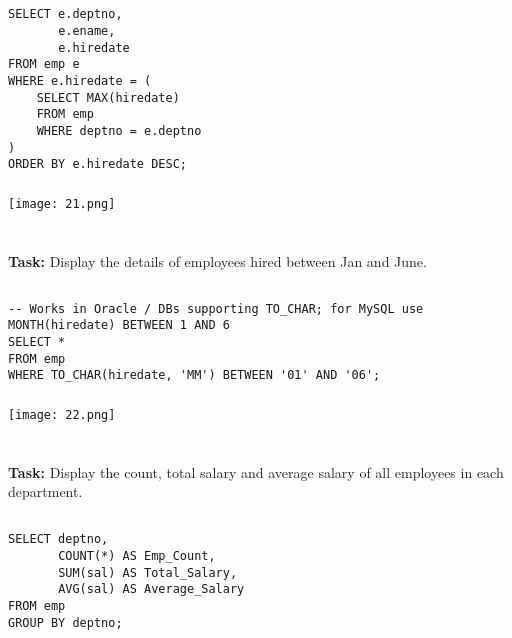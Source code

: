 \documentclass[12pt,a4paper]{article}
\begin{document}
\subsection{}
\begin{lstlisting}
SELECT e.deptno,
       e.ename,
       e.hiredate
FROM emp e
WHERE e.hiredate = (
    SELECT MAX(hiredate)
    FROM emp
    WHERE deptno = e.deptno
)
ORDER BY e.hiredate DESC;
\end{lstlisting}

\subsubsection{}
\begin{center}
    \texttt{[image: 21.png]}
\end{center}


\section{}
\textbf{Task:} Display the details of employees hired between Jan and June.

\subsection{}
\begin{lstlisting}
-- Works in Oracle / DBs supporting TO_CHAR; for MySQL use MONTH(hiredate) BETWEEN 1 AND 6
SELECT *
FROM emp
WHERE TO_CHAR(hiredate, 'MM') BETWEEN '01' AND '06';
\end{lstlisting}

\subsubsection{}
\begin{center}
    \texttt{[image: 22.png]}
\end{center}


\section{}
\textbf{Task:} Display the count, total salary and average salary of all employees in each
department.

\subsection{}
\begin{lstlisting}
SELECT deptno,
       COUNT(*) AS Emp_Count,
       SUM(sal) AS Total_Salary,
       AVG(sal) AS Average_Salary
FROM emp
GROUP BY deptno;
\end{lstlisting}
\end{document}
